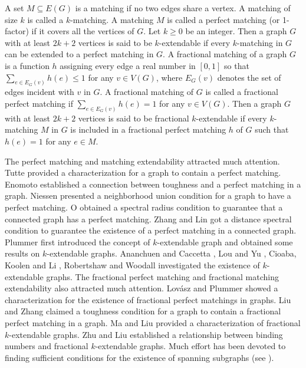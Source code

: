 \documentclass[10pt]{article}
\numberwithin{equation}{section}
\begin{document}
A set $M\subseteq E(G)$ is a matching if no two edges share a vertex. A matching of size $k$ is called a $k$-matching. A matching $M$ is called a
perfect matching (or 1-factor) if it covers all the vertices of $G$. Let $k\geq0$ be an integer. Then a graph $G$ with at least $2k+2$ vertices is
said to be $k$-extendable if every $k$-matching in $G$ can be extended to a perfect matching in $G$. A fractional matching of a graph $G$ is a
function $h$ assigning every edge a real number in $[0,1]$ so that $\sum\limits_{e\in E_G(v)}{h(e)}\leq1$ for any $v\in V(G)$, where $E_G(v)$
denotes the set of edges incident with $v$ in $G$. A fractional matching of $G$ is called a fractional perfect matching if
$\sum\limits_{e\in E_G(v)}{h(e)}=1$ for any $v\in V(G)$. Then a graph $G$ with at least $2k+2$ vertices is said to be fractional $k$-extendable if
every $k$-matching $M$ in $G$ is included in a fractional perfect matching $h$ of $G$ such that $h(e)=1$ for any $e\in M$.

The perfect matching and matching extendability attracted much attention. Tutte \cite{T} provided a characterization for a graph to contain a perfect
matching. Enomoto \cite{E} established a connection between toughness and a perfect matching in a graph. Niessen \cite{N} presented a neighborhood
union condition for a graph to have a perfect matching. O \cite{Os} obtained a spectral radius condition to guarantee that a connected graph has a
perfect matching. Zhang and Lin \cite{ZLp} got a distance spectral condition to guarantee the existence of a perfect matching in a connected graph.
Plummer \cite{P1} first introduced the concept of $k$-extendable graph and obtained some results on $k$-extendable graphs. Ananchuen and Caccetta
\cite{AC}, Lou and Yu \cite{LY}, Cioaba, Koolen and Li \cite{CKL}, Robertshaw and Woodall \cite{RW} investigated the existence of $k$-extendable
graphs. The fractional perfect matching and fractional matching extendability also attracted much attention. Lov\'asz and Plummer \cite{LP} showed
a characterization for the existence of fractional perfect matchings in graphs. Liu and Zhang \cite{LZ} claimed a toughness condition for a graph
to contain a fractional perfect matching in a graph. Ma and Liu \cite{ML} provided a characterization of fractional $k$-extendable graphs. Zhu and
Liu \cite{ZLs} established a relationship between binding numbers and fractional $k$-extendable graphs. Much effort has been devoted to finding
sufficient conditions for the existence of spanning subgraphs (see \cite{Zs,ZSL1,Zr,ZZL2,WZhi,Wp,M,ZWa,ZZS,GWC,Zt,ZZL1}).
\end{document}
